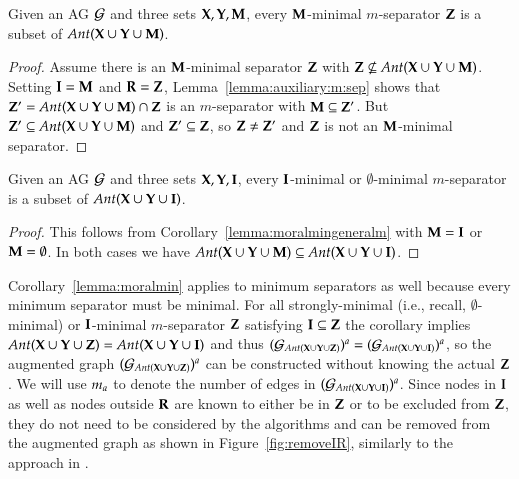 

\begin{corollary}
Given an AG ${\cal G}$ and three sets ${\bf X},{\bf Y},{\bf M}$, every ${\bf M}$-minimal $m$-separator ${\bf Z}$   %
is a subset of $\textit{Ant}({\bf X}\cup{\bf Y}\cup{\bf M})$. 
\label{lemma:moralmingeneralm}
\end{corollary}
\begin{proof}
Assume there is an $ {\bf M} $-minimal separator ${\bf Z}$ with 
$ {\bf Z} \not\subseteq \textit{Ant}({\bf X}\cup{\bf Y}\cup{\bf M})$.
Setting ${\bf I}= {\bf M}$ and ${\bf R}={\bf Z}$, Lemma~\ref{lemma:auxiliary:m:sep} shows that ${\bf Z}' = \textit{Ant}({\bf X}\cup{\bf Y}\cup{\bf M}) \cap {\bf Z}$ is an $m$-separator with 
${\bf M} \subseteq {\bf Z}'$. But ${\bf Z}' \subseteq \textit{Ant}({\bf X}\cup{\bf Y}\cup{\bf M})$ and 
${\bf Z}' \subseteq {\bf Z}$, so ${\bf Z} \not= {\bf Z}'$ and ${\bf Z}$ is not an $ {\bf M} $-minimal separator.
\end{proof}

%

\begin{corollary}
Given an AG ${\cal G}$ and three sets ${\bf X},{\bf Y},{\bf I}$, every 
$ {\bf I} $-minimal  or $ \emptyset$-minimal   
$m$-separator %
is a subset of $\textit{Ant}({\bf X}\cup{\bf Y}\cup{\bf I})$. 
\label{lemma:moralmin}
\end{corollary}
\begin{proof}
This follows from Corollary~\ref{lemma:moralmingeneralm} with  ${\bf M}= {\bf I}$ or ${\bf M}= \emptyset$.
In both cases we have  $\textit{Ant}({\bf X}\cup{\bf Y}\cup{\bf M})\subseteq\textit{Ant}({\bf X}\cup{\bf Y}\cup{\bf I})$. 
\end{proof}




%
%
%
%
%
%
%






Corollary~\ref{lemma:moralmin} applies to minimum separators as well because
every minimum separator must be minimal.
For all strongly-minimal (i.e., recall,  $ \emptyset $-minimal) 
or $ {\bf I} $-minimal $ m $-separator ${\bf Z}$ satisfying ${\bf I} \subseteq {\bf Z}$ the corollary implies $\textit{Ant}({\bf X}\cup{\bf Y}\cup{\bf Z}) = \textit{Ant}({\bf X}\cup{\bf Y}\cup{\bf I})$ and thus $({\cal G}_{\textit{Ant}({\bf X}\cup{\bf Y}\cup{\bf Z})})^a = ({\cal G}_{\textit{Ant}({\bf X}\cup{\bf Y}\cup{\bf I})})^a$, so the augmented graph $({\cal G}_{\textit{Ant}({\bf X}\cup{\bf Y}\cup{\bf Z})})^a$ can be constructed without knowing the actual ${\bf Z}$. We will use $m_{a}$ to denote the number of edges in $({\cal G}_{\textit{Ant}({\bf X}\cup{\bf Y}\cup{\bf I})})^a$. Since nodes in ${\bf I}$ as well as nodes outside  ${\bf R}$ are known to either be in ${\bf Z}$ or to be excluded from ${\bf Z}$, they do not need to be considered by the algorithms and can be removed from the augmented graph as shown in Figure~\ref{fig:removeIR}, similarly to the approach in \cite{Acid1996}.%



